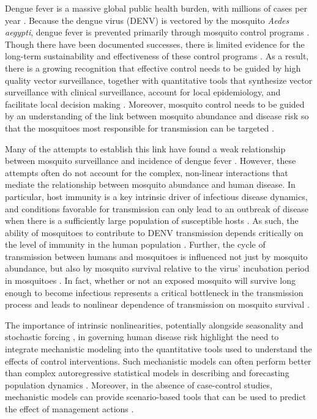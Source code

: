 \documentclass[10pt,letterpaper]{article}
\begin{document}
Dengue fever is a massive global public health burden, with millions of cases per year \cite{Bhatt2013}.  
Because the dengue virus (DENV) is vectored by the mosquito \textit{Aedes aegypti}, dengue fever is prevented primarily through mosquito control programs \cite{Achee2015}.
Though there have been documented successes, there is limited evidence for the long-term sustainability and effectiveness of these control programs \cite{Morrison2008}.
As a result, there is a growing recognition that effective control needs to be guided by high quality vector surveillance, together with quantitative tools that synthesize vector surveillance with clinical surveillance, account for local epidemiology, and facilitate local decision making \cite{Morrison2008, Scott2010b}.
Moreover, mosquito control needs to be guided by an understanding of the link between mosquito abundance and disease risk so that the mosquitoes most responsible for transmission can be targeted \cite{Scott2010a, Scott2010b}.

Many of the attempts to establish this link have found a weak relationship between mosquito surveillance and incidence of dengue fever \cite{Bowman2014, Pepin2015, Cromwell2017}.
However, these attempts often do not account for the complex, non-linear interactions that mediate the relationship between mosquito abundance and human disease.
In particular, host immunity is a key intrinsic driver of infectious disease dynamics, and conditions favorable for transmission can only lead to an outbreak of disease when there is a sufficiently large population of susceptible hosts \cite{Koelle2004, Koelle2005}.
As such, the ability of mosquitoes to contribute to DENV transmission depends critically on the level of immunity in the human population \cite{Scott2010a}.
Further, the cycle of transmission between humans and mosquitoes is influenced not just by mosquito abundance, but also by mosquito survival relative to the virus' incubation period in mosquitoes \cite{Smith2012}.
In fact, whether or not an exposed mosquito will survive long enough to become infectious represents a critical bottleneck in the transmission process and leads to nonlinear dependence of transmission on mosquito survival \cite{Smith2012}.

The importance of intrinsic nonlinearities, potentially alongside seasonality and stochastic forcing \cite{Ellner1998, Koelle2004, Grenfell2002}, in governing human disease risk highlight the need to integrate mechanistic modeling into the quantitative tools used to understand the effects of control interventions.
Such mechanistic models can often perform better than complex autoregressive statistical models in describing and forecasting population dynamics \cite{Reilly2005}.
Moreover, in the absence of case-control studies, mechanistic models can provide scenario-based tools that can be used to predict the effect of management actions \cite{Buckland2007}.
\end{document}
